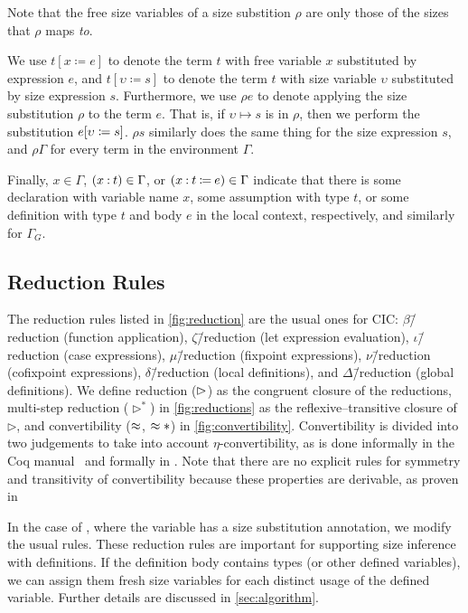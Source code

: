 Note that the free size variables of a size substition $\rho$ are only those of the sizes that $\rho$ maps \emph{to}.

We use $t[x \coloneqq e]$ to denote the term $t$ with free variable $x$ substituted by expression $e$,
and $t[\upsilon \coloneqq s]$ to denote the term $t$ with size variable $\upsilon$ substituted by size expression $s$.
Furthermore, we use $\rho e$ to denote applying the size substitution $\rho$ to the term $e$.
That is, if $\upsilon \mapsto s$ is in $\rho$, then we perform the substitution $e [\upsilon \coloneqq s]$.
$\rho s$ similarly does the same thing for the size expression $s$, and $\rho \Gamma$ for every term in the environment $\Gamma$.

Finally, $x \in \Gamma$, $(x \mathbin{:} t) \in \Gamma$, or $(x \mathbin{:} t \mathbin{\coloneqq} e) \in \Gamma$ indicate that there is some declaration with variable name $x$, some assumption with type $t$, or some definition with type $t$ and body $e$ in the local context, respectively, and similarly for $\Gamma_G$.
\subsection{Reduction Rules}

The reduction rules listed in \autoref{fig:reduction} are the usual ones for CIC: $\beta$\=/reduction (function application), $\zeta$\=/reduction (let expression evaluation), $\iota$\=/reduction (case expressions), $\mu$\=/reduction (fixpoint expressions), $\nu$\=/reduction (cofixpoint expressions), $\delta$\=/reduction (local definitions), and $\Delta$\=/reduction (global definitions).
We define reduction ($\mathrel{\rhd}$) as the congruent closure of the reductions,
multi-step reduction ($\rhd^*$) in \autoref{fig:reductions} as the reflexive--transitive closure of $\rhd$,
and convertibility ($\mathrel{\approx}$, $\mathrel{\approx}*$) in \autoref{fig:convertibility}.
Convertibility is divided into two judgements to take into account $\eta$-convertibility,
as is done informally in the Coq manual~\citep{coq} and formally in \citet{conversion}.
Note that there are no explicit rules for symmetry and transitivity of convertibility
because these properties are derivable, as proven in



In the case of \deltaDeltareduction, where the variable has a size substitution annotation, we modify the usual rules.
These reduction rules are important for supporting size inference with definitions.
If the definition body contains \coinductive types (or other defined variables), we can assign them fresh size variables for each distinct usage of the defined variable.
Further details are discussed in \autoref{sec:algorithm}.

